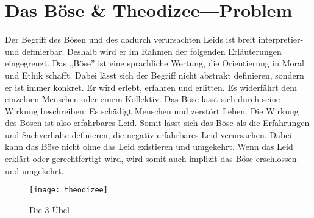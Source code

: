\chapter{Das Böse \& Theodizee---Problem}\label{sec:Theodizee}
Der Begriff des \glqq Bösen\grqq{} und des dadurch verursachten Leids ist breit interpretier- und definierbar. Deshalb wird er im Rahmen der folgenden Erläuterungen eingegrenzt. Das „Böse” ist eine sprachliche Wertung, die Orientierung in Moral und Ethik schafft. Dabei lässt sich der Begriff nicht abstrakt definieren, sondern er ist immer konkret. Er wird erlebt, erfahren und erlitten. Es widerfährt dem einzelnen Menschen oder einem Kollektiv. Das Böse lässt sich durch seine Wirkung beschreiben: Es schädigt Menschen und zerstört Leben. Die Wirkung des Bösen ist also erfahrbares Leid. Somit lässt sich das Böse als die Erfahrungen und Sachverhalte definieren, die negativ erfahrbares Leid verursachen. Dabei kann das Böse nicht ohne das Leid existieren und umgekehrt. Wenn das Leid erklärt oder gerechtfertigt wird, wird somit auch implizit das Böse erschlossen – und umgekehrt.\\

\begin{wrapfigure}[20]{l}{0.45\linewidth}
    \begin{center}
        \texttt{[image: theodizee]}
        \caption{Die 3 Übel}\label{fig:theodizee}
    \end{center}
\end{wrapfigure}

